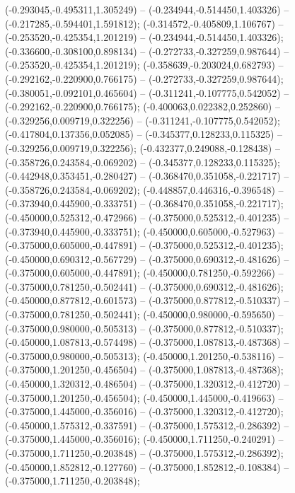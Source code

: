  (-0.293045,-0.495311,1.305249) -- (-0.234944,-0.514450,1.403326) -- (-0.217285,-0.594401,1.591812);
 (-0.314572,-0.405809,1.106767) -- (-0.253520,-0.425354,1.201219) -- (-0.234944,-0.514450,1.403326);
 (-0.336600,-0.308100,0.898134) -- (-0.272733,-0.327259,0.987644) -- (-0.253520,-0.425354,1.201219);
 (-0.358639,-0.203024,0.682793) -- (-0.292162,-0.220900,0.766175) -- (-0.272733,-0.327259,0.987644);
 (-0.380051,-0.092101,0.465604) -- (-0.311241,-0.107775,0.542052) -- (-0.292162,-0.220900,0.766175);
 (-0.400063,0.022382,0.252860) -- (-0.329256,0.009719,0.322256) -- (-0.311241,-0.107775,0.542052);
 (-0.417804,0.137356,0.052085) -- (-0.345377,0.128233,0.115325) -- (-0.329256,0.009719,0.322256);
 (-0.432377,0.249088,-0.128438) -- (-0.358726,0.243584,-0.069202) -- (-0.345377,0.128233,0.115325);
 (-0.442948,0.353451,-0.280427) -- (-0.368470,0.351058,-0.221717) -- (-0.358726,0.243584,-0.069202);
 (-0.448857,0.446316,-0.396548) -- (-0.373940,0.445900,-0.333751) -- (-0.368470,0.351058,-0.221717);
 (-0.450000,0.525312,-0.472966) -- (-0.375000,0.525312,-0.401235) -- (-0.373940,0.445900,-0.333751);
 (-0.450000,0.605000,-0.527963) -- (-0.375000,0.605000,-0.447891) -- (-0.375000,0.525312,-0.401235);
 (-0.450000,0.690312,-0.567729) -- (-0.375000,0.690312,-0.481626) -- (-0.375000,0.605000,-0.447891);
 (-0.450000,0.781250,-0.592266) -- (-0.375000,0.781250,-0.502441) -- (-0.375000,0.690312,-0.481626);
 (-0.450000,0.877812,-0.601573) -- (-0.375000,0.877812,-0.510337) -- (-0.375000,0.781250,-0.502441);
 (-0.450000,0.980000,-0.595650) -- (-0.375000,0.980000,-0.505313) -- (-0.375000,0.877812,-0.510337);
 (-0.450000,1.087813,-0.574498) -- (-0.375000,1.087813,-0.487368) -- (-0.375000,0.980000,-0.505313);
 (-0.450000,1.201250,-0.538116) -- (-0.375000,1.201250,-0.456504) -- (-0.375000,1.087813,-0.487368);
 (-0.450000,1.320312,-0.486504) -- (-0.375000,1.320312,-0.412720) -- (-0.375000,1.201250,-0.456504);
 (-0.450000,1.445000,-0.419663) -- (-0.375000,1.445000,-0.356016) -- (-0.375000,1.320312,-0.412720);
 (-0.450000,1.575312,-0.337591) -- (-0.375000,1.575312,-0.286392) -- (-0.375000,1.445000,-0.356016);
 (-0.450000,1.711250,-0.240291) -- (-0.375000,1.711250,-0.203848) -- (-0.375000,1.575312,-0.286392);
 (-0.450000,1.852812,-0.127760) -- (-0.375000,1.852812,-0.108384) -- (-0.375000,1.711250,-0.203848);
